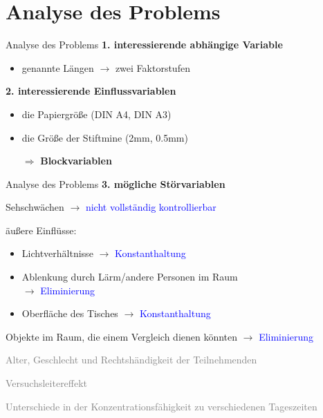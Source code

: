 \documentclass[ ngerman, fontsize= 10pt, headings=big, titlepage=true, xcolor=dvipsnames]{beamer}
\begin{document}
\section{Analyse des Problems}
\begin{frame}{Analyse des Problems}
	\textbf{1. interessierende abhängige Variable}
	\begin{itemize}
	\item genannte Längen $\rightarrow$ zwei Faktorstufen
	\end{itemize}
	\textbf{2. interessierende Einflussvariablen}
	\begin{itemize}
	\item die Papiergröße (DIN A4, DIN A3)
	\item die Größe der Stiftmine (2mm, 0.5mm)
	\item[$\Rightarrow$] \textbf{Blockvariablen}
	\end{itemize}
\end{frame}
\begin{frame}{Analyse des Problems}
    \textbf{3. mögliche Störvariablen}
    \begin{itemize}
    \item Sehschwächen $\rightarrow$ \textcolor{blue}{nicht vollständig kontrollierbar}
    \item äußere Einflüsse: 
    \begin{itemize}
    \item Lichtverhältnisse $\rightarrow$ \textcolor{blue}{Konstanthaltung}
    \item Ablenkung durch Lärm/andere Personen im Raum \\ $\rightarrow$ \textcolor{blue}{Eliminierung}
    \item Oberfläche des Tisches $\rightarrow$ \textcolor{blue}{Konstanthaltung}
    \end{itemize}
    \item Objekte im Raum, die einem Vergleich dienen könnten $\rightarrow$ \textcolor{blue}{Eliminierung}
   \textcolor{gray}{
    \item Alter, Geschlecht und Rechtshändigkeit der Teilnehmenden
    \item Versuchsleitereffekt
    \item Unterschiede in der Konzentrationsfähigkeit zu verschiedenen Tageszeiten
    }
    \end{itemize}
    
\end{frame}
\end{document}
